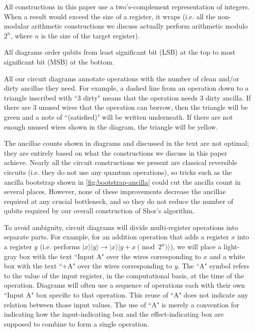 \documentclass[twocolumn,longbibliography]{quantumarticle}
\begin{document}
All constructions in this paper use a two's-complement representation of integers.
When a result would exceed the size of a register, it wraps (i.e. all the non-modular arithmetic constructions we discuss actually perform arithmetic modulo $2^n$, where $n$ is the size of the target register).

All diagrams order qubits from least significant bit (LSB) at the top to most significant bit (MSB) at the bottom.

All our circuit diagrams annotate operations with the number of clean and/or dirty ancillae they need.
For example, a dashed line from an operation down to a triangle inscribed with ``3 dirty" means that the operation needs 3 dirty ancilla.
If there are 3 unused wires that the operation can borrow, then the triangle will be green and a note of ``(satisfied)" will be written underneath.
If there are not enough unused wires shown in the diagram, the triangle will be yellow.

The ancillae counts shown in diagrams and discussed in the text are not optimal; they are entirely based on what the constructions we discuss in this paper achieve.
Nearly all the circuit constructions we present are classical reversible circuits (i.e. they do not use any quantum operations), so tricks such as the ancilla bootstrap shown in \autoref{fig:bootstrap-ancilla} could cut the ancilla count in several places.
However, none of these improvements decrease the ancillae required at any crucial bottleneck, and so they do not reduce the number of qubits required by our overall construction of Shor's algorithm.

To avoid ambiguity, circuit diagrams will divide multi-register operations into separate parts.
For example, for an addition operation that adds a register $x$ into a register $y$ (i.e. performs $|x\rangle |y\rangle \rightarrow |x\rangle |y + x \pmod{2^n} \rangle$), we will place a light-gray box with the text ``Input A" over the wires corresponding to $x$ and a white box with the text ``+A" over the wires corresponding to $y$.
The ``A" symbol refers to the value of the input register, in the computational basis, at the time of the operation.
Diagrams will often use a sequence of operations each with their own ``Input A" box specific to that operation.
This reuse of ``A" does not indicate any relation between those input values.
The use of ``A" is merely a convention for indicating how the input-indicating box and the effect-indicating box are supposed to combine to form a single operation.
\end{document}
